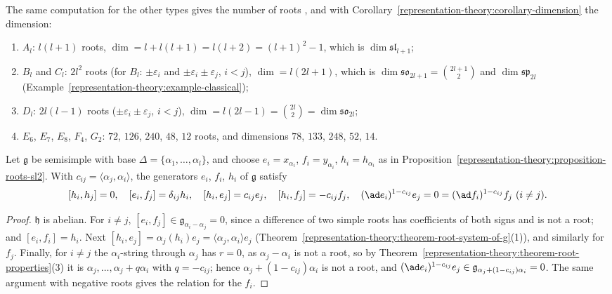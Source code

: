 \begin{example}
The same computation for the other types gives the number of roots \cite[Section 12.1]{humphreys-lie}, and with Corollary~\ref{representation-theory:corollary-dimension} the
dimension:
\begin{enumerate}
\item $A_l$: $l(l + 1)$ roots, $\dim = l + l(l + 1) = l(l + 2) = (l + 1)^2 - 1$, which is $\dim\mathfrak{sl}_{l+1}$;
\item $B_l$ and $C_l$: $2l^2$ roots (for $B_l$: $\pm\varepsilon_i$ and $\pm\varepsilon_i \pm \varepsilon_j$, $i < j$), $\dim = l(2l + 1)$, which is $\dim\mathfrak{so}_{2l+1} = \binom{2l+1}{2}$ and
$\dim\mathfrak{sp}_{2l}$ (Example~\ref{representation-theory:example-classical});
\item $D_l$: $2l(l - 1)$ roots ($\pm\varepsilon_i \pm \varepsilon_j$, $i < j$), $\dim = l(2l - 1) = \binom{2l}{2} = \dim\mathfrak{so}_{2l}$;
\item $E_6$, $E_7$, $E_8$, $F_4$, $G_2$: $72$, $126$, $240$, $48$, $12$ roots, and dimensions $78$, $133$, $248$, $52$, $14$.
\end{enumerate}
\end{example}

\begin{proposition}\label{representation-theory:proposition-serre-relations}
Let $\mathfrak{g}$ be semisimple with base $\Delta = \{\alpha_1, \ldots, \alpha_l\}$, and choose $e_i = x_{\alpha_i}$, $f_i = y_{\alpha_i}$, $h_i = h_{\alpha_i}$ as in
Proposition~\ref{representation-theory:proposition-roots-sl2}. With $c_{ij} = \langle\alpha_j, \alpha_i\rangle$, the generators $e_i$, $f_i$, $h_i$ of $\mathfrak{g}$ satisfy
\[
[h_i, h_j] = 0, \quad [e_i, f_j] = \delta_{ij}h_i, \quad [h_i, e_j] = c_{ij}e_j, \quad [h_i, f_j] = -c_{ij}f_j, \quad (\ad e_i)^{1 - c_{ij}}e_j = 0 = (\ad f_i)^{1 - c_{ij}}f_j \ (i \neq j).
\]
\end{proposition}

\begin{proof}
$\mathfrak{h}$ is abelian. For $i \neq j$, $[e_i, f_j] \in \mathfrak{g}_{\alpha_i - \alpha_j} = 0$, since a difference of two simple roots has coefficients of both signs and is not a root; and
$[e_i, f_i] = h_i$. Next $[h_i, e_j] = \alpha_j(h_i)e_j = \langle\alpha_j, \alpha_i\rangle e_j$ (Theorem~\ref{representation-theory:theorem-root-system-of-g}(1)), and similarly for $f_j$. Finally, for $i \neq j$
the $\alpha_i$-string through $\alpha_j$ has $r = 0$, as $\alpha_j - \alpha_i$ is not a root, so by Theorem~\ref{representation-theory:theorem-root-properties}(3) it is $\alpha_j, \ldots, \alpha_j + q\alpha_i$
with $q = -c_{ij}$; hence $\alpha_j + (1 - c_{ij})\alpha_i$ is not a root, and $(\ad e_i)^{1 - c_{ij}}e_j \in \mathfrak{g}_{\alpha_j + (1 - c_{ij})\alpha_i} = 0$. The same argument with negative roots gives
the relation for the $f_i$.
\end{proof}

